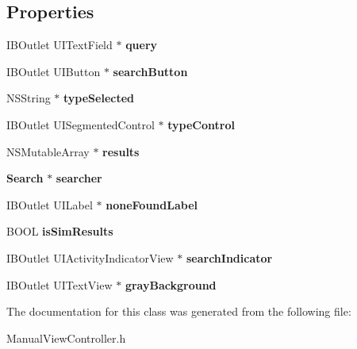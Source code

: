\subsection*{Properties}
\begin{DoxyCompactItemize}
\item 
I\+B\+Outlet U\+I\+Text\+Field $\ast$ {\bfseries query}\label{interface_manual_view_controller_ac25b8675461f6b134f294d9d000d9acb}

\item 
I\+B\+Outlet U\+I\+Button $\ast$ {\bfseries search\+Button}\label{interface_manual_view_controller_add89d2a25455a77ac93a6d36b197fd5b}

\item 
N\+S\+String $\ast$ {\bfseries type\+Selected}\label{interface_manual_view_controller_a62433952d153e6ec83ab6b5abe6e9355}

\item 
I\+B\+Outlet U\+I\+Segmented\+Control $\ast$ {\bfseries type\+Control}\label{interface_manual_view_controller_a3ed5cace841a47be8974104d6c12d708}

\item 
N\+S\+Mutable\+Array $\ast$ {\bfseries results}\label{interface_manual_view_controller_ae31761f23bddb440bbc90bb863860457}

\item 
{\bf Search} $\ast$ {\bfseries searcher}\label{interface_manual_view_controller_a0941a4f7be19492af2df58b8cd677f1e}

\item 
I\+B\+Outlet U\+I\+Label $\ast$ {\bfseries none\+Found\+Label}\label{interface_manual_view_controller_afb8fb2ba7d2fb64adaee3d7e184210f1}

\item 
B\+O\+O\+L {\bfseries is\+Sim\+Results}\label{interface_manual_view_controller_a20df493383dde01e934348e4ccb33090}

\item 
I\+B\+Outlet U\+I\+Activity\+Indicator\+View $\ast$ {\bfseries search\+Indicator}\label{interface_manual_view_controller_ab7d5ed6694032c058f36de73cbbfffe1}

\item 
I\+B\+Outlet U\+I\+Text\+View $\ast$ {\bfseries gray\+Background}\label{interface_manual_view_controller_adefbb904483341f811d5997aaa1adedc}

\end{DoxyCompactItemize}


The documentation for this class was generated from the following file\+:\begin{DoxyCompactItemize}
\item 
Manual\+View\+Controller.\+h\end{DoxyCompactItemize}
